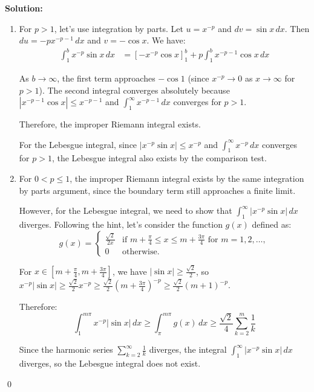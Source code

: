 \bigskip\noindent\textbf{Solution:}
\begin{enumerate}[label=(\alph*)]
\item For $p > 1$, let's use integration by parts. Let $u = x^{-p}$ and $dv = \sin x \, dx$. Then $du = -px^{-p-1} \, dx$ and $v = -\cos x$. We have:
\begin{align*}
\int_1^b x^{-p} \sin x \, dx &= \left[-x^{-p} \cos x\right]_1^b + p \int_1^b x^{-p-1} \cos x \, dx
\end{align*}

As $b \to \infty$, the first term approaches $-\cos 1$ (since $x^{-p} \to 0$ as $x \to \infty$ for $p > 1$). The second integral converges absolutely because $|x^{-p-1} \cos x| \leq x^{-p-1}$ and $\int_1^\infty x^{-p-1} \, dx$ converges for $p > 1$.

Therefore, the improper Riemann integral exists.

For the Lebesgue integral, since $|x^{-p} \sin x| \leq x^{-p}$ and $\int_1^\infty x^{-p} \, dx$ converges for $p > 1$, the Lebesgue integral also exists by the comparison test.

\item For $0 < p \leq 1$, the improper Riemann integral exists by the same integration by parts argument, since the boundary term still approaches a finite limit.

However, for the Lebesgue integral, we need to show that $\int_1^\infty |x^{-p} \sin x| \, dx$ diverges. Following the hint, let's consider the function $g(x)$ defined as:
\[g(x) = 
\begin{cases} 
\frac{\sqrt{2}}{2x} & \text{if } m + \frac{\pi}{4} \leq x \leq m + \frac{3\pi}{4} \text{ for } m = 1, 2, \ldots, \\ 
0 & \text{otherwise}.
\end{cases}\]

For $x \in [m + \frac{\pi}{4}, m + \frac{3\pi}{4}]$, we have $|\sin x| \geq \frac{\sqrt{2}}{2}$, so $x^{-p} |\sin x| \geq \frac{\sqrt{2}}{2} x^{-p} \geq \frac{\sqrt{2}}{2} (m + \frac{3\pi}{4})^{-p} \geq \frac{\sqrt{2}}{2} (m + 1)^{-p}$.

Therefore:
\[\int_{1}^{m\pi} x^{-p} |\sin x| \, dx \geq \int_{\pi}^{m\pi} g(x) \, dx \geq \frac{\sqrt{2}}{4} \sum_{k=2}^{m} \frac{1}{k}\]

Since the harmonic series $\sum_{k=2}^{\infty} \frac{1}{k}$ diverges, the integral $\int_1^\infty |x^{-p} \sin x| \, dx$ diverges, so the Lebesgue integral does not exist.
\end{enumerate}\qed


